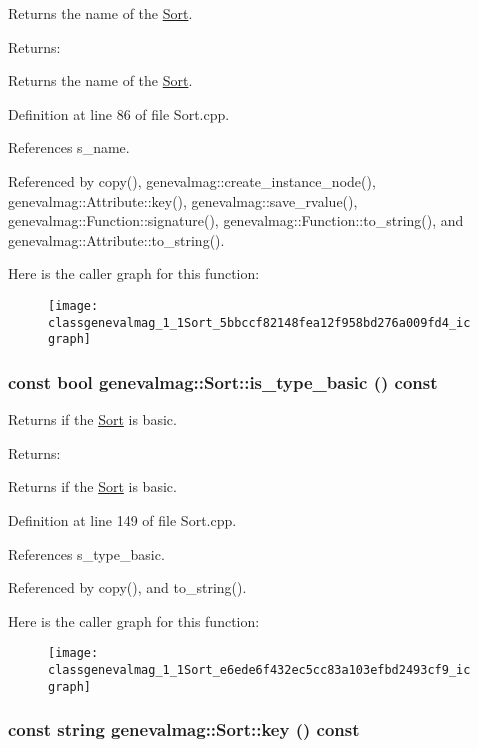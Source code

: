 Returns the name of the \hyperlink{classgenevalmag_1_1Sort}{Sort}. \begin{Desc}
\item[Returns:]\end{Desc}
Returns the name of the \hyperlink{classgenevalmag_1_1Sort}{Sort}. 

Definition at line 86 of file Sort.cpp.

References s\_\-name.

Referenced by copy(), genevalmag::create\_\-instance\_\-node(), genevalmag::Attribute::key(), genevalmag::save\_\-rvalue(), genevalmag::Function::signature(), genevalmag::Function::to\_\-string(), and genevalmag::Attribute::to\_\-string().

Here is the caller graph for this function:\nopagebreak
\begin{figure}[H]
\begin{center}
\leavevmode
\texttt{[image: classgenevalmag\_1\_1Sort\_5bbccf82148fea12f958bd276a009fd4\_icgraph]}
\end{center}
\end{figure}
\hypertarget{classgenevalmag_1_1Sort_e6ede6f432ec5cc83a103efbd2493cf9}{
\subsubsection[{is\_\-type\_\-basic}]{\setlength{\rightskip}{0pt plus 5cm}const bool genevalmag::Sort::is\_\-type\_\-basic () const}}
\label{classgenevalmag_1_1Sort_e6ede6f432ec5cc83a103efbd2493cf9}


Returns if the \hyperlink{classgenevalmag_1_1Sort}{Sort} is basic. \begin{Desc}
\item[Returns:]\end{Desc}
Returns if the \hyperlink{classgenevalmag_1_1Sort}{Sort} is basic. 

Definition at line 149 of file Sort.cpp.

References s\_\-type\_\-basic.

Referenced by copy(), and to\_\-string().

Here is the caller graph for this function:\nopagebreak
\begin{figure}[H]
\begin{center}
\leavevmode
\texttt{[image: classgenevalmag\_1\_1Sort\_e6ede6f432ec5cc83a103efbd2493cf9\_icgraph]}
\end{center}
\end{figure}
\hypertarget{classgenevalmag_1_1Sort_68cc79c2d28feb6d24173adcfc4864ce}{
\subsubsection[{key}]{\setlength{\rightskip}{0pt plus 5cm}const string genevalmag::Sort::key () const}}
\label{classgenevalmag_1_1Sort_68cc79c2d28feb6d24173adcfc4864ce}



